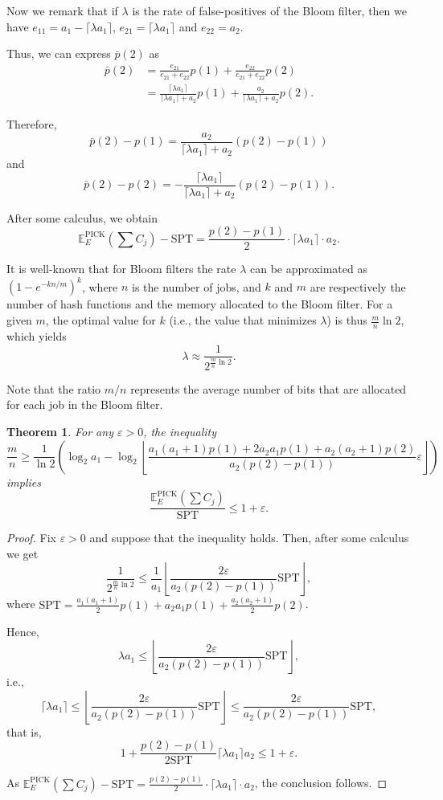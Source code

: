 \documentclass{article}
\newtheorem{theorem}{Theorem}
\begin{document}
Now we remark that if \(\lambda\) is the rate of false-positives of the Bloom filter, then we have \(e_{11}=a_1-\lceil\lambda a_1\rceil\), \(e_{21}=\lceil\lambda a_1\rceil\) and \(e_{22}=a_2\).

Thus, we can express \(\bar{p}(2)\) as
\begin{align*}
    \bar{p}(2)
    &=\frac{e_{21}}{e_{21}+e_{22}}p(1)+\frac{e_{22}}{e_{21}+e_{22}}p(2) \\
    &=\frac{\lceil\lambda a_1\rceil}{\lceil\lambda a_1\rceil+a_2}p(1)+\frac{a_2}{\lceil\lambda a_1\rceil+a_2}p(2).
\end{align*}

Therefore,
\[
    \bar{p}(2)-p(1)=\frac{a_2}{\lceil\lambda a_1\rceil+a_2}(p(2)-p(1))
\]
and
\[
    \bar{p}(2)-p(2)=-\frac{\lceil\lambda a_1\rceil}{\lceil\lambda a_1\rceil+a_2}(p(2)-p(1)).
\]

After some calculus, we obtain
\[
    \mathbb{E}_E^{\text{PICK}}\left(\sum C_j\right)-\text{SPT}=\frac{p(2)-p(1)}{2}\cdot\lceil\lambda a_1\rceil\cdot a_2.
\]

It is well-known that for Bloom filters the rate \(\lambda\) can be approximated as \(\left(1-e^{-kn/m}\right)^k\), where \(n\) is the number of jobs, and \(k\) and \(m\) are respectively the number of hash functions and the memory allocated to the Bloom filter.
For a given \(m\), the optimal value for \(k\) (i.e., the value that minimizes \(\lambda\)) is thus \(\frac{m}{n}\ln 2\), which yields
\[
    \lambda\approx\frac{1}{2^{\frac{m}{n}\ln 2}}.
\]

Note that the ratio \(m/n\) represents the average number of bits that are allocated for each job in the Bloom filter.

\begin{theorem}
    For any \(\varepsilon>0\), the inequality
    \[
        \frac{m}{n}\ge\frac{1}{\ln 2}\left(\log_2 a_1-\log_2\left\lfloor\frac{a_1(a_1+1)p(1)+2a_2a_1p(1)+a_2(a_2+1)p(2)}{a_2(p(2)-p(1))}\varepsilon\right\rfloor\right)
    \]
    implies
    \[
        \frac{\mathbb{E}_E^{\text{PICK}}\left(\sum C_j\right)}{\text{SPT}}\le 1+\varepsilon.
    \]
\end{theorem}
\begin{proof}
    Fix \(\varepsilon>0\) and suppose that the inequality holds. Then, after some calculus we get
    \[
        \frac{1}{2^{\frac{m}{n}\ln 2}}\le\frac{1}{a_1}\left\lfloor\frac{2\varepsilon}{a_2(p(2)-p(1))}\text{SPT}\right\rfloor,
    \]
    where \(\text{SPT}=\frac{a_1(a_1+1)}{2}p(1)+a_2a_1p(1)+\frac{a_2(a_2+1)}{2}p(2)\).

    Hence,
    \[
        \lambda a_1\le\left\lfloor\frac{2\varepsilon}{a_2(p(2)-p(1))}\text{SPT}\right\rfloor,
    \]
    i.e.,
    \[
        \lceil\lambda a_1\rceil\le\left\lfloor\frac{2\varepsilon}{a_2(p(2)-p(1))}\text{SPT}\right\rfloor\le\frac{2\varepsilon}{a_2(p(2)-p(1))}\text{SPT},
    \]
    that is,
    \[
        1+\frac{p(2)-p(1)}{2\text{SPT}}\lceil\lambda a_1\rceil a_2\le 1+\varepsilon.
    \]

    As \(\mathbb{E}_E^{\text{PICK}}\left(\sum C_j\right)-\text{SPT}=\frac{p(2)-p(1)}{2}\cdot\lceil\lambda a_1\rceil\cdot a_2\), the conclusion follows.
\end{proof}
\end{document}
